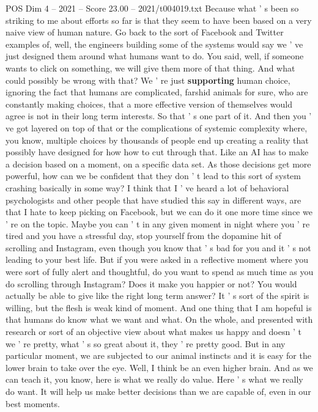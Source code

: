 \begin{textsample}{POS Dim 4 – 2021 – Score 23.00 – 2021/t004019.txt}
Because what ' s been so striking to me about efforts so far is that they seem to have been based on a very naive view of human nature.
Go back to the sort of Facebook and Twitter examples of, well, the engineers building some of the systems would say we ' ve just designed them around what humans want to do.
You said, well, if someone wants to click on something, we will give them more of that thing.
And what could possibly be wrong with that?
We ' re just \textbf{supporting} human choice, ignoring the fact that humans are complicated, farshid animals for sure, who are constantly making choices, that a more effective version of themselves would agree is not in their long term interests.
So that ' s one part of it.
And then you ' ve got layered on top of that or the complications of systemic complexity where, you know, multiple choices by thousands of people end up creating a reality that possibly have designed for how how to cut through that.
Like an AI has to make a decision based on a moment, on a specific data set.
As those decisions get more powerful, how can we be confident that they don ' t lead to this sort of system crashing basically in some way?
I think that I ' ve heard a lot of behavioral psychologists and other people that have studied this say in different ways, are that I hate to keep picking on Facebook, but we can do it one more time since we ' re on the topic.
Maybe you can ' t in any given moment in night where you ' re tired and you have a stressful day, stop yourself from the dopamine hit of scrolling and Instagram, even though you know that ' s bad for you and it ' s not leading to your best life.
But if you were asked in a reflective moment where you were sort of fully alert and thoughtful, do you want to spend as much time as you do scrolling through Instagram?
Does it make you happier or not?
You would actually be able to give like the right long term answer?
It ' s sort of the spirit is willing, but the flesh is weak kind of moment.
And one thing that I am hopeful is that humans do know what we want and what.
On the whole, and presented with research or sort of an objective view about what makes us happy and doesn ' t we ' re pretty, what ' s so great about it, they ' re pretty good.
But in any particular moment, we are subjected to our animal instincts and it is easy for the lower brain to take over the eye.
Well, I think be an even higher brain.
And as we can teach it, you know, here is what we really do value.
Here ' s what we really do want.
It will help us make better decisions than we are capable of, even in our best moments.

\end{textsample}

